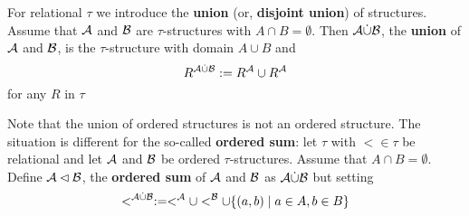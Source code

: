 \documentclass[11pt]{article}
\begin{document}
For relational \(\tau\) we introduce the \textbf{union} (or, \textbf{disjoint union}) of structures. Assume
that \(\mathcal{A}\) and \(\mathcal{B}\) are \(\tau\)-structures with \(A\cap B=\emptyset\).
Then \(\mathcal{A}\dot{\cup}\mathcal{B}\), the \textbf{union} of \(\mathcal{A}\) and \(\mathcal{B}\), is the \(\tau\)-structure
with domain \(A\cup B\) and
\begin{equation*}
R^{\mathcal{A}\dot\cup\mathcal{B}}:=R^{\mathcal{A}}\cup R^{\mathcal{A}}
\end{equation*}
for any \(R\) in \(\tau\)

Note that the union of ordered structures is not an ordered structure. The situation is
different for the so-called \textbf{ordered sum}: let \(\tau\) with \(<\in\tau\) be relational and
let \(\mathcal{A}\) and \(\mathcal{B}\) be ordered \(\tau\)-structures. Assume that \(A\cap B=\emptyset\).
Define \(\mathcal{A}\lhd\mathcal{B}\), the \textbf{ordered sum} of \(\mathcal{A}\) and \(\mathcal{B}\) as \(\mathcal{A}\dot\cup\mathcal{B}\)
but setting
\begin{equation*}
<^{\mathcal{A}\dot\cup\mathcal{B}}:=<^{\mathcal{A}}\cup <^{\mathcal{B}}\cup
\{(a,b)\mid a\in A,b\in B\}
\end{equation*}
\end{document}

